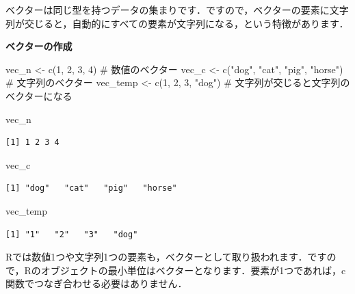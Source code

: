 \documentclass[
  letterpaper,
  DIV=11,
  numbers=noendperiod]{scrreprt}
\newenvironment{Shaded}{\begin{snugshade}}{\end{snugshade}}
\newcommand{\CommentTok}[1]{\textcolor[rgb]{0.37,0.37,0.37}{#1}}
\newcommand{\DecValTok}[1]{\textcolor[rgb]{0.68,0.00,0.00}{#1}}
\newcommand{\FunctionTok}[1]{\textcolor[rgb]{0.28,0.35,0.67}{#1}}
\newcommand{\NormalTok}[1]{\textcolor[rgb]{0.00,0.23,0.31}{#1}}
\newcommand{\OtherTok}[1]{\textcolor[rgb]{0.00,0.23,0.31}{#1}}
\newcommand{\StringTok}[1]{\textcolor[rgb]{0.13,0.47,0.30}{#1}}
\begin{document}
ベクターは同じ型を持つデータの集まりです．ですので，ベクターの要素に文字列が交じると，自動的にすべての要素が文字列になる，という特徴があります．

\textbf{ベクターの作成}

\begin{Shaded}
\begin{Highlighting}[]
\NormalTok{vec\_n }\OtherTok{\textless{}{-}} \FunctionTok{c}\NormalTok{(}\DecValTok{1}\NormalTok{, }\DecValTok{2}\NormalTok{, }\DecValTok{3}\NormalTok{, }\DecValTok{4}\NormalTok{) }\CommentTok{\# 数値のベクター}
\NormalTok{vec\_c }\OtherTok{\textless{}{-}} \FunctionTok{c}\NormalTok{(}\StringTok{"dog"}\NormalTok{, }\StringTok{"cat"}\NormalTok{, }\StringTok{"pig"}\NormalTok{, }\StringTok{"horse"}\NormalTok{) }\CommentTok{\# 文字列のベクター}
\NormalTok{vec\_temp }\OtherTok{\textless{}{-}} \FunctionTok{c}\NormalTok{(}\DecValTok{1}\NormalTok{, }\DecValTok{2}\NormalTok{, }\DecValTok{3}\NormalTok{, }\StringTok{"dog"}\NormalTok{) }\CommentTok{\# 文字列が交じると文字列のベクターになる}

\NormalTok{vec\_n}
\end{Highlighting}
\end{Shaded}

\begin{verbatim}
[1] 1 2 3 4
\end{verbatim}

\begin{Shaded}
\begin{Highlighting}[]
\NormalTok{vec\_c}
\end{Highlighting}
\end{Shaded}

\begin{verbatim}
[1] "dog"   "cat"   "pig"   "horse"
\end{verbatim}

\begin{Shaded}
\begin{Highlighting}[]
\NormalTok{vec\_temp}
\end{Highlighting}
\end{Shaded}

\begin{verbatim}
[1] "1"   "2"   "3"   "dog"
\end{verbatim}

Rでは数値1つや文字列1つの要素も，ベクターとして取り扱われます．ですので，Rのオブジェクトの最小単位はベクターとなります．要素が1つであれば，c関数でつなぎ合わせる必要はありません．
\end{document}

